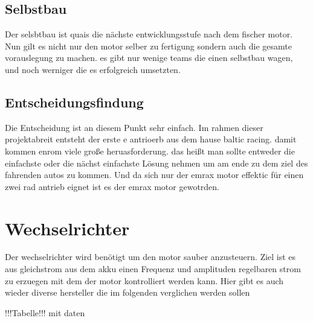 \subsection{Selbstbau}
Der selsbtbau ist quais die nächste entwicklungsstufe nach dem fischer motor. Nun gilt es nicht nur den motor selber zu fertigung sondern auch die gesamte vorauslegung zu machen. es gibt nur wenige teams die einen selbstbau wagen, und noch werniger die es erfolgreich umsetzten.

\subsection{Entscheidungsfindung}
Die Entscheidung ist an diesem Punkt sehr einfach. Im rahmen dieser projektabreit entsteht der erste e antrioerb aus dem hause baltic racing. damit kommen enrom viele große heruasforderung. das heißt man sollte entweder die einfachste oder die nächst einfachste Lösung nehmen um am ende zu dem ziel des fahrenden autos zu kommen. Und da sich nur der emrax motor effektic für einen zwei rad antrieb eignet ist es der emrax motor gewotrden.

\section{Wechselrichter}
Der wechselrichter wird benötigt um den motor sauber anzusteuern. Ziel ist es aus gleichstrom aus dem akku einen Frequenz und amplituden regelbaren strom zu erzuegen mit dem der motor kontrolliert werden kann. Hier gibt es auch wieder diverse hersteller die im folgenden verglichen werden sollen

!!!Tabelle!!! mit daten

